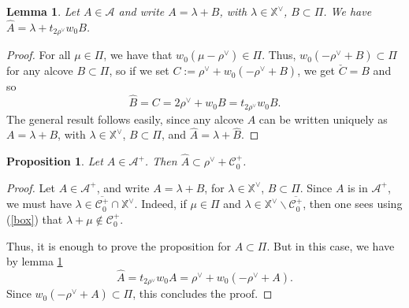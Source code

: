 \documentclass[11pt]{amsart}
\theoremstyle{plain}
\newtheorem{lem}[thm]{Lemma}
\newtheorem{prop}[thm]{Proposition}
\theoremstyle{remark}
\numberwithin{equation}{section}
\begin{document}
	\begin{lem}\label{lemhat}
		Let $A\in\mathcal{A}$ and write $A=\lambda+B$, with $\lambda\in\mathbb{X}^\vee$, $B\subset\Pi$. We have $\hat{A}=\lambda+t_{2\rho^\vee}w_0B$.
	\end{lem}
	\begin{proof}
		For all $\mu\in\Pi$, we have that $w_0(\mu-\rho^\vee)\in\Pi$. Thus, $w_0(-\rho^\vee+B)\subset\Pi$ for any alcove $B\subset\Pi$, so if we set $C:=\rho^\vee+w_0(-\rho^\vee+B)$, we get $\check{C}=B$ and so 
		$$\hat{B}=C=2\rho^\vee+w_0B=t_{2\rho^\vee}w_0B.$$
		The general result follows easily, since any alcove $A$ can be written uniquely as  $A=\lambda+B$, with $\lambda\in\mathbb{X}^\vee$, $B\subset\Pi$, and $\hat{A}=\lambda+\hat{B}$.
	\end{proof}
	\begin{prop}\label{decalage rho}
		Let $A\in\mathcal{A}^+$. Then $\hat{A}\subset \rho^\vee+\mathscr{C}_0^+$.
	\end{prop}
	\begin{proof}
		Let $A\in\mathcal{A}^+$, and write $A=\lambda+B$, for $\lambda\in\mathbb{X}^\vee$, $B\subset\Pi$. Since $A$ is in $\mathcal{A}^+$, we must have $\lambda\in\overline{\mathscr{C}^+_{0}}\cap\mathbb{X}^\vee$. Indeed, if $\mu\in\Pi$ and $\lambda\in\mathbb{X}^\vee\backslash\overline{\mathscr{C}^+_{0}}$, then one sees using (\ref{box}) that $\lambda+\mu\notin\mathscr{C}^+_0$.
		
		Thus, it is enough to prove the proposition for $A\subset \Pi$. But in this case, we have by lemma \ref{lemhat}
		$$\hat{A}=t_{2\rho^\vee}w_0A=\rho^\vee+w_0(-\rho^\vee+A).$$
		Since $w_0(-\rho^\vee+A)\subset\Pi$, this concludes the proof.
	\end{proof}
	
\end{document}
